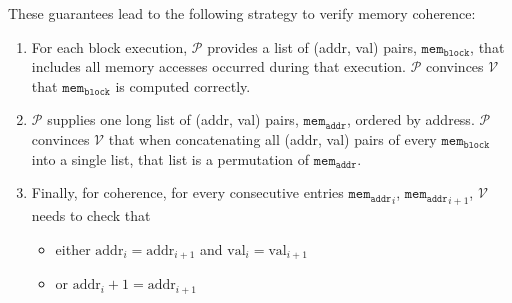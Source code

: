\documentclass{article}
\renewcommand{\P}{\mathcal{P}}
\newcommand{\V}{\mathcal{V}}
\newcommand{\memb}{\mathtt{mem_{block}}}
\newcommand{\mema}{\mathtt{mem_{addr}}}
\newcommand{\addr}{\mbox{addr}}
\newcommand{\val}{\mbox{val}}
\begin{document}
These guarantees lead to the following strategy to verify memory coherence:
\begin{enumerate}
    \item For each block execution, $\P$ provides a list of (addr, val) pairs, $\memb$, that includes all memory accesses occurred during that execution. $\P$ convinces $\V$ that $\memb$ is computed correctly.
    \item $\P$ supplies one long list of (addr, val) pairs, $\mema$, ordered by address. $\P$ convinces $\V$ that when concatenating all (addr, val) pairs of every $\memb$ into a single list, that list is a permutation of $\mema$.
    \item Finally, for coherence, for every consecutive entries ${\mema}_i$, ${\mema}_{i+1}$, $\V$ needs to check that
    \begin{itemize}
        \item either $\addr_i = \addr_{i+1}$ and $\val_i = \val_{i+1}$
        \item or $\addr_i + 1 = \addr_{i+1}$
    \end{itemize}
\end{enumerate}
\end{document}
